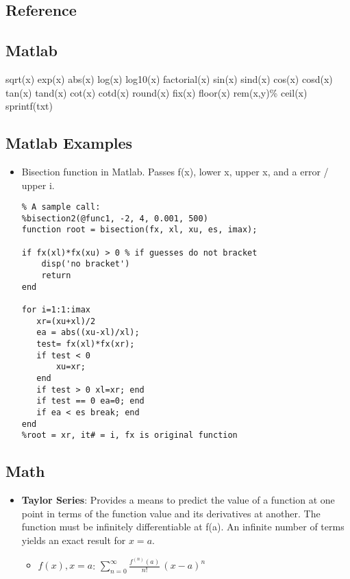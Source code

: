 \documentclass[fontsize=4pt]{scrartcl}
\begin{document}
\begin{multicols}{4}
  \columnbreak

  \section{Reference}
    \subsection{Matlab}
      sqrt(x)
      exp(x)
      abs(x) 
      log(x)
      log10(x)
      factorial(x)
      sin(x)
      sind(x)
      cos(x)
      cosd(x)
      tan(x)
      tand(x)
      cot(x)
      cotd(x)
      round(x)
      fix(x)
      floor(x)
      rem(x,y)\%
      ceil(x)
      sprintf(txt)
    \subsection{Matlab Examples}
      \begin{itemize}
        \item Bisection function in Matlab. Passes f(x), lower x, upper x, and a error / upper i.
        \lstset{language=Matlab}
        \begin{lstlisting}
% A sample call:
%bisection2(@func1, -2, 4, 0.001, 500)
function root = bisection(fx, xl, xu, es, imax);

if fx(xl)*fx(xu) > 0 % if guesses do not bracket
    disp('no bracket')
    return
end

for i=1:1:imax
   xr=(xu+xl)/2
   ea = abs((xu-xl)/xl);
   test= fx(xl)*fx(xr);
   if test < 0
       xu=xr;
   end
   if test > 0 xl=xr; end
   if test == 0 ea=0; end
   if ea < es break; end
end
%root = xr, it# = i, fx is original function
        \end{lstlisting}%
      \end{itemize}%
    \subsection{Math}
      \begin{itemize}
      \item \textbf{Taylor Series}: Provides a means to predict the value of a function at one point in terms of
             the function value and its derivatives at another. The function must be infinitely differentiable
             at f(a). An infinite number of terms yields an exact result for $x=a$.
        \begin{itemize}
          \item $f(x), x=a$: $\sum_{n=0} ^ {\infty} \frac {f^{(n)}(a)}{n!} \, (x-a)^{n}$
        \end{itemize}
      \end{itemize}
  \end{multicols}
\end{document}
